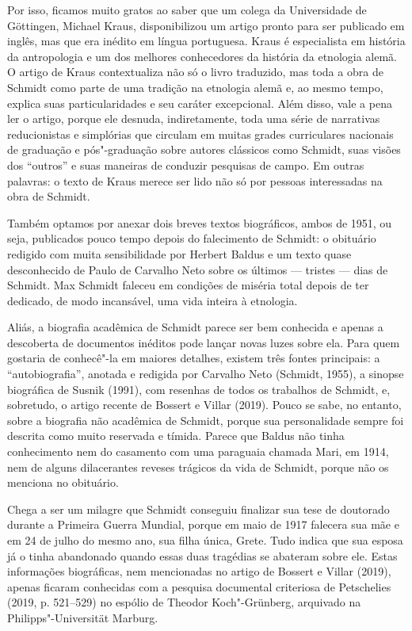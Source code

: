 Por isso, ficamos muito gratos ao saber que um colega da Universidade de
Göttingen, Michael Kraus, disponibilizou um artigo pronto para ser
publicado em inglês, mas que era inédito em língua portuguesa. Kraus é
especialista em história da antropologia e um dos melhores conhecedores
da história da etnologia alemã. O artigo de Kraus contextualiza não só o
livro traduzido, mas toda a obra de Schmidt como parte de uma tradição
na etnologia alemã e, ao mesmo tempo, explica suas particularidades e
seu caráter excepcional. Além disso, vale a pena ler o artigo, porque
ele desnuda, indiretamente, toda uma série de narrativas reducionistas e
simplórias que circulam em muitas grades curriculares nacionais de
graduação e pós"-graduação sobre autores clássicos como Schmidt, suas
visões dos ``outros'' e suas maneiras de conduzir pesquisas de campo. Em
outras palavras: o texto de Kraus merece ser lido não só por pessoas
interessadas na obra de Schmidt.

Também optamos por anexar dois breves textos biográficos, ambos de
1951, ou seja, publicados pouco tempo depois do falecimento de Schmidt:
o obituário redigido com muita sensibilidade por Herbert Baldus e um
texto quase desconhecido de Paulo de Carvalho Neto sobre os últimos ---
tristes --- dias de Schmidt. Max Schmidt faleceu em condições de miséria
total depois de ter dedicado, de modo incansável, uma vida inteira à
etnologia.

Aliás, a biografia acadêmica de Schmidt parece ser bem conhecida e
apenas a descoberta de documentos inéditos pode lançar novas luzes sobre
ela. Para quem gostaria de conhecê"-la em maiores detalhes, existem três
fontes principais: a ``autobiografia'', anotada e redigida por Carvalho
Neto (Schmidt, 1955), a sinopse biográfica de Susnik (1991), com
resenhas de todos os trabalhos de Schmidt, e, sobretudo, o artigo
recente de Bossert e Villar (2019). Pouco se sabe, no entanto, sobre a
biografia não acadêmica de Schmidt, porque sua personalidade sempre foi
descrita como muito reservada e tímida. Parece que Baldus não tinha
conhecimento nem do casamento com uma paraguaia chamada Mari, em 1914,
nem de alguns dilacerantes reveses trágicos da vida de Schmidt, porque
não os menciona no obituário.

Chega a ser um milagre que Schmidt conseguiu finalizar sua tese de
doutorado durante a Primeira Guerra Mundial, porque em maio de 1917
falecera sua mãe e em 24 de julho do mesmo ano, sua filha única, Grete.
Tudo indica que sua esposa já o tinha abandonado quando essas duas
tragédias se abateram sobre ele. Estas informações biográficas, nem
mencionadas no artigo de Bossert e Villar (2019), apenas ficaram
conhecidas com a pesquisa documental criteriosa de Petschelies (2019, p.
521--529) no espólio de Theodor Koch"-Grünberg, arquivado na
Philipps"-Universität Marburg.

